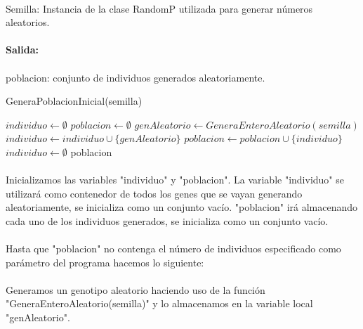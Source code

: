 	\paragraph{}Semilla: Instancia de la clase RandomP utilizada para generar números aleatorios.
	
	\newpage
	
	\paragraph{Salida:}
	
	\paragraph{}poblacion: conjunto de individuos generados aleatoriamente.
	\begin{algorithm}[H]
		\caption{GeneraPoblacionInicial(semilla)}
		\begin{algorithmic}
			\STATE $individuo \leftarrow \emptyset$
			\STATE $poblacion \leftarrow \emptyset$
					\STATE $genAleatorio \leftarrow GeneraEnteroAleatorio(semilla)$
						\STATE $individuo \leftarrow individuo\cup\{genAleatorio\}$
					\ENDIF
				\ENDWHILE
				\STATE $poblacion \leftarrow poblacion\cup\{individuo\}$
				\STATE $individuo \leftarrow \emptyset$
				\ENDWHILE
			\RETURN poblacion
		\end{algorithmic}
	\end{algorithm}

	\paragraph{}Inicializamos las variables "individuo" y "poblacion". La variable "individuo" se utilizará como contenedor de todos los genes que se vayan generando aleatoriamente, se inicializa como un conjunto vacío. "poblacion" irá almacenando cada uno de los individuos generados, se inicializa como un conjunto vacío.
	
	\paragraph{}Hasta que "poblacion" no contenga el número de individuos especificado como parámetro del programa hacemos lo siguiente:
	
	\paragraph{}Generamos un genotipo aleatorio haciendo uso de la función "GeneraEnteroAleatorio(semilla)" y lo almacenamos en la variable local "genAleatorio".
	
